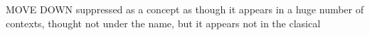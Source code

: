 MOVE DOWN suppressed as a concept as though it appears in a huge number of contexts, thought not under the name, but it appears not in the clasical

